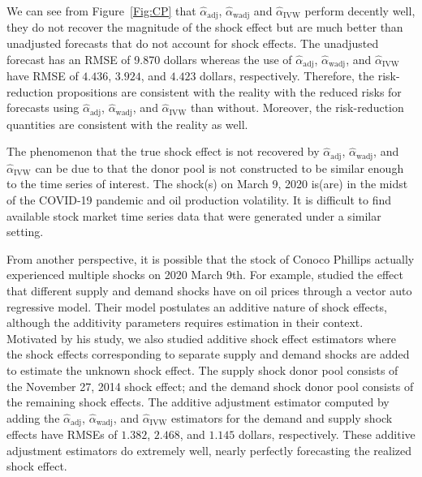 \documentclass[11pt]{article}
\theoremstyle{definition}
\begin{document}
We can see from Figure~\ref{Fig:CP} that $\hat{\alpha}_{\text{adj}}$, $\hat{\alpha}_{\text{wadj}}$ and $\hat{\alpha}_{\text{IVW}}$ perform decently well, they do not recover the magnitude of the shock effect but are much better than unadjusted forecasts that do not account for shock effects. 
The unadjusted forecast has an RMSE of 9.870 dollars whereas 
the use of $\hat{\alpha}_{\text{adj}}$, $\hat{\alpha}_{\text{wadj}}$, and $\hat{\alpha}_{\text{IVW}}$ have  RMSE of $4.436$, $3.924$, and $4.423$ dollars, respectively. 
Therefore, the risk-reduction propositions are consistent with the reality  with the reduced risks for forecasts using  $\hat{\alpha}_{\text{adj}}$, $\hat{\alpha}_{\text{wadj}}$, and $\hat{\alpha}_{\text{IVW}}$ than without. Moreover, the risk-reduction quantities are consistent with the reality as well. 


The phenomenon that the true shock effect is not recovered by $\hat{\alpha}_{\text{adj}}$, $\hat{\alpha}_{\text{wadj}}$, and $\hat{\alpha}_{\text{IVW}}$ can be due to that the donor pool is not constructed to be similar enough to the time series of interest. The shock(s) on March 9, 2020 is(are) in the midst of the COVID-19 pandemic and oil production volatility. It is difficult to find available stock market time series data that were generated under a similar setting.  


From another perspective, it is possible that the stock of Conoco Phillips actually experienced multiple shocks on 2020 March 9th. For example, \citet{kilian2009not} studied the effect that different supply and demand shocks have on oil prices through a vector auto regressive model. Their model postulates an additive nature of shock effects, although the additivity parameters requires estimation in their context. Motivated by his study, we also studied additive shock effect estimators where the shock effects corresponding to separate supply and demand shocks are added to estimate the unknown shock effect. The supply shock donor pool consists of the November 27, 2014 shock effect; and the demand shock donor pool consists of the remaining shock effects. The additive adjustment estimator computed by adding the $\hat{\alpha}_{\text{adj}}$, $\hat{\alpha}_{\text{wadj}}$, and $\hat{\alpha}_{\text{IVW}}$ estimators for the demand and supply shock effects have  RMSEs of $1.382$, $2.468$, and $1.145$ dollars, respectively. These additive adjustment estimators do extremely well, nearly perfectly forecasting the realized shock effect. 
\end{document}
